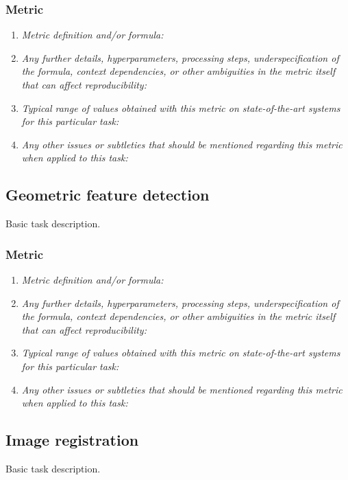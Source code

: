 \documentclass[a4paper,11pt]{article}
\begin{document}
    \subsubsection{Metric}
        \begin{enumerate}[label=\alph*.]
            \item \textit{Metric definition and/or formula:}
            \bigskip
            \item \textit{Any further details, hyperparameters, processing steps, underspecification of the formula, context dependencies, or other ambiguities in the metric itself that can affect reproducibility:}
            \bigskip
            \item \textit{Typical range of values obtained with this metric on state-of-the-art systems for this particular task:}
            \bigskip
            \item \textit{Any other issues or subtleties that should be mentioned regarding this metric when applied to this task:}
            \bigskip
        \end{enumerate}

\subsection{Geometric feature detection}
    Basic task description.
    \subsubsection{Metric}
        \begin{enumerate}[label=\alph*.]
            \item \textit{Metric definition and/or formula:}
            \bigskip
            \item \textit{Any further details, hyperparameters, processing steps, underspecification of the formula, context dependencies, or other ambiguities in the metric itself that can affect reproducibility:}
            \bigskip
            \item \textit{Typical range of values obtained with this metric on state-of-the-art systems for this particular task:}
            \bigskip
            \item \textit{Any other issues or subtleties that should be mentioned regarding this metric when applied to this task:}
            \bigskip
        \end{enumerate}

\subsection{Image registration}
    Basic task description.
\end{document}
